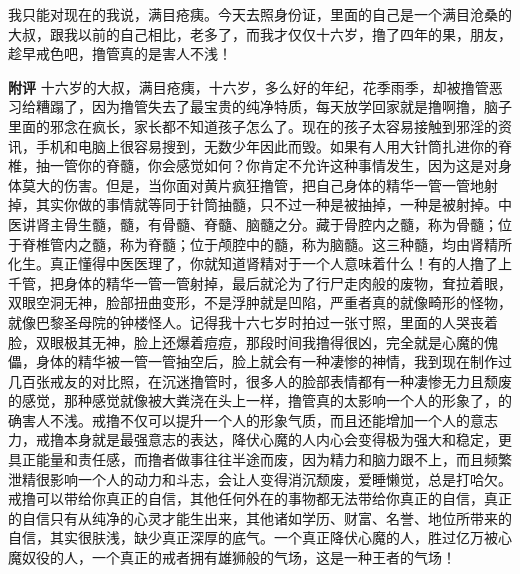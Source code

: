 \begin{case}
    我只能对现在的我说，满目疮痍。今天去照身份证，里面的自己是一个满目沧桑的大叔，跟我以前的自己相比，老多了，而我才仅仅十六岁，撸了四年的果，朋友，趁早戒色吧，撸管真的是害人不浅！

    \textbf{附评} 十六岁的大叔，满目疮痍，十六岁，多么好的年纪，花季雨季，却被撸管恶习给糟蹋了，因为撸管失去了最宝贵的纯净特质，每天放学回家就是撸啊撸，脑子里面的邪念在疯长，家长都不知道孩子怎么了。现在的孩子太容易接触到邪淫的资讯，手机和电脑上很容易搜到，无数少年因此而毁。如果有人用大针筒扎进你的脊椎，抽一管你的脊髓，你会感觉如何？你肯定不允许这种事情发生，因为这是对身体莫大的伤害。但是，当你面对黄片疯狂撸管，把自己身体的精华一管一管地射掉，其实你做的事情就等同于针筒抽髓，只不过一种是被抽掉，一种是被射掉。中医讲肾主骨生髓，髓，有骨髓、脊髓、脑髓之分。藏于骨腔内之髓，称为骨髓；位于脊椎管内之髓，称为脊髓；位于颅腔中的髓，称为脑髓。这三种髓，均由肾精所化生。真正懂得中医医理了，你就知道肾精对于一个人意味着什么！有的人撸了上千管，把身体的精华一管一管射掉，最后就沦为了行尸走肉般的废物，耷拉着眼，双眼空洞无神，脸部扭曲变形，不是浮肿就是凹陷，严重者真的就像畸形的怪物，就像巴黎圣母院的钟楼怪人。记得我十六七岁时拍过一张寸照，里面的人哭丧着脸，双眼极其无神，脸上还爆着痘痘，那段时间我撸得很凶，完全就是心魔的傀儡，身体的精华被一管一管抽空后，脸上就会有一种凄惨的神情，我到现在制作过几百张戒友的对比照，在沉迷撸管时，很多人的脸部表情都有一种凄惨无力且颓废的感觉，那种感觉就像被大粪浇在头上一样，撸管真的太影响一个人的形象了，的确害人不浅。戒撸不仅可以提升一个人的形象气质，而且还能增加一个人的意志力，戒撸本身就是最强意志的表达，降伏心魔的人内心会变得极为强大和稳定，更具正能量和责任感，而撸者做事往往半途而废，因为精力和脑力跟不上，而且频繁泄精很影响一个人的动力和斗志，会让人变得消沉颓废，爱睡懒觉，总是打哈欠。戒撸可以带给你真正的自信，其他任何外在的事物都无法带给你真正的自信，真正的自信只有从纯净的心灵才能生出来，其他诸如学历、财富、名誉、地位所带来的自信，其实很肤浅，缺少真正深厚的底气。一个真正降伏心魔的人，胜过亿万被心魔奴役的人，一个真正的戒者拥有雄狮般的气场，这是一种王者的气场！
\end{case}

